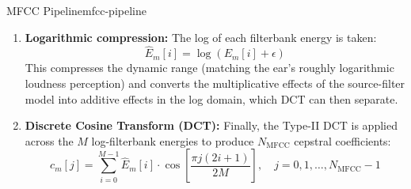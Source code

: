 \documentclass[12pt]{report}
\begin{document}
\begin{tecbox}{MFCC Pipeline}{mfcc-pipeline}
\begin{enumerate}
          The triangular filters are defined by center frequencies $\{c_i\}_{i=1}^M$ that are
          \emph{uniformly spaced on the mel scale} (equivalently, logarithmically spaced on the
          Hz scale at higher frequencies). Each filter $H_i[k]$ is:
          \begin{equation}
              H_i[k] = \begin{cases}
                  \dfrac{f[k] - c_{i-1}}{c_i - c_{i-1}} & c_{i-1} \leq f[k] < c_i \\[6pt]
                  \dfrac{c_{i+1} - f[k]}{c_{i+1} - c_i} & c_i \leq f[k] \leq c_{i+1} \\[6pt]
                  0 & \text{otherwise}
              \end{cases}
          \end{equation}

          The filterbank energy for the $m$-th frame and $i$-th filter is:
          \begin{equation}
              E_m[i] = \sum_{k=0}^{N_\text{FFT}/2} H_i[k] \cdot P_m[k]
          \end{equation}

          \textbf{Why mel scaling?} The human cochlea has higher frequency resolution at low
          frequencies (below $\sim$1\,kHz) and progressively lower resolution above. The mel
          scale mimics this: filters are narrow and closely spaced at low frequencies (capturing
          fine pitch and formant details) and wide at high frequencies (where perceptual
          discrimination is coarser).

    \item \textbf{Logarithmic compression:} The log of each filterbank energy is taken:
          \begin{equation}
              \hat{E}_m[i] = \log(E_m[i] + \epsilon)
          \end{equation}
          This compresses the dynamic range (matching the ear's roughly logarithmic loudness
          perception) and converts the multiplicative effects of the source-filter model into
          additive effects in the log domain, which DCT can then separate.

    \item \textbf{Discrete Cosine Transform (DCT):} Finally, the Type-II DCT is applied
          across the $M$ log-filterbank energies to produce $N_\text{MFCC}$ cepstral coefficients:
          \begin{equation}
              c_m[j] = \sum_{i=0}^{M-1} \hat{E}_m[i] \cdot \cos\!\left[\frac{\pi j (2i+1)}{2M}\right],
              \quad j = 0, 1, \ldots, N_\text{MFCC}-1
          \end{equation}


\end{enumerate}
\end{tecbox}
\end{document}
